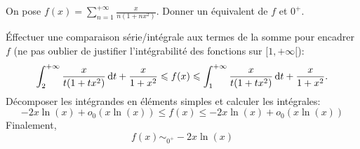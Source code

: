 \begin{exercice}
    On pose $f(x) = \sum\limits_{n=1}^{+\infty}\frac{x}{n(1+nx^2)}$. Donner un équivalent de $f$ et $0^+$.
\end{exercice}

\begin{solution}
    Éffectuer une comparaison série/intégrale aux termes de la somme pour encadrer $f$ (ne pas oublier de justifier l'intégrabilité des fonctions sur $[1, +\infty[$):
    $$\int_{2}^{+\infty} \frac{x}{t(1+tx^2)} \, \mathrm{d} t + \frac{x}{1+x^2} \leqslant f(x) \leqslant \int_{1}^{+\infty} \frac{x}{t(1+tx^2)} \, \mathrm{d} t + \frac{x}{1+x^2}.$$ 
    Décomposer les intégrandes en éléments simples et calculer les intégrales:
    $$-2x \ln(x) + o_0(x\ln(x)) \leqslant f(x) \leqslant -2x \ln(x) + o_0(x\ln(x))$$
    Finalement, 
    $$f(x) \sim_{0^+} -2x\ln(x)$$
\end{solution}